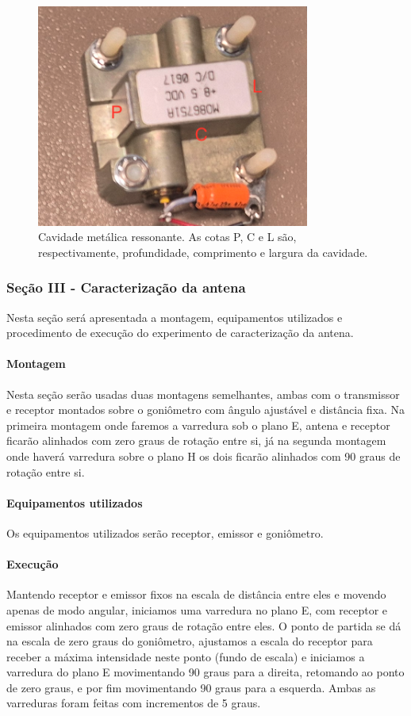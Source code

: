 \documentclass[12pt]{article}
\begin{document}
\begin{figure}[H]
  \centering
  \includegraphics[width=0.8\textwidth]{img/metodo2cavidade.png}
  \caption{Cavidade metálica ressonante. As cotas P, C e L são,
  respectivamente, profundidade, comprimento e largura da cavidade.}
  \label{fig:img/metodo2cavidade.png}
\end{figure}

\subsubsection{Seção III - Caracterização da antena}
Nesta seção será apresentada a montagem, equipamentos utilizados e
procedimento de execução do experimento de caracterização da antena.

\paragraph{Montagem}
Nesta seção serão usadas duas montagens semelhantes, ambas com o
transmissor e receptor montados sobre o goniômetro com ângulo
ajustável e distância fixa. Na primeira montagem onde faremos a
varredura sob o plano E, antena e receptor ficarão alinhados com zero
graus de rotação entre si, já na segunda montagem onde haverá
varredura sobre o plano H os dois ficarão alinhados com 90 graus de
rotação entre si.

\paragraph{Equipamentos utilizados}
Os equipamentos utilizados serão receptor, emissor e goniômetro.

\paragraph{Execução}
Mantendo receptor e emissor fixos na escala de distância entre eles e
movendo apenas de modo angular, iniciamos uma varredura no plano E,
com receptor e emissor alinhados com zero graus de rotação entre
eles. O ponto de partida se dá na escala de zero graus do goniômetro,
ajustamos a escala do receptor para receber a máxima intensidade
neste ponto (fundo de escala) e iniciamos a varredura do plano E
movimentando 90 graus para a direita, retomando ao ponto de zero
graus, e por fim movimentando 90 graus para a esquerda. Ambas as
varreduras foram feitas com incrementos de 5 graus.
\end{document}
